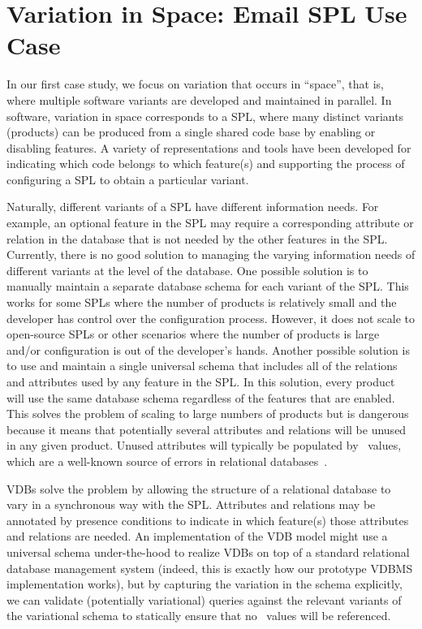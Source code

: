 \section{Variation in Space: Email SPL Use Case}
\label{sec:enron-vdb}


In our first case study, we focus on variation that occurs in ``space'', that
is, where multiple software variants are developed and maintained in parallel.
In software, variation in space corresponds to a SPL, where many distinct
variants (products) can be produced from a single shared code base by enabling
or disabling features. A variety of representations and tools have been
developed for indicating which code belongs to which feature(s) and supporting
the process of configuring a SPL to obtain a particular variant.



Naturally, different variants of a SPL have different information needs. For
example, an optional feature in the SPL may require a corresponding attribute
or relation in the database that is not needed by the other features in the
SPL.
%
Currently, there is no good solution to managing the varying information needs
of different variants at the level of the database.
%
One possible solution is to manually maintain a separate database schema for
each variant of the SPL. This works for some SPLs where the number of products
is relatively small and the developer has control over the configuration
process. However, it does not scale to open-source SPLs or other scenarios
where the number of products is large and/or configuration is out of the
developer's hands.
%
Another possible solution is to use and maintain a single universal schema that
includes all of the relations and attributes used by any feature in the SPL. In
this solution, every product will use the same database schema regardless of
the features that are enabled. This solves the problem of scaling to large
numbers of products but is dangerous because it means that potentially several
attributes and relations will be unused in any given product. Unused attributes
will typically be populated by \nul\ values, which are a well-known source of
errors in relational databases~\cite{AliceBook}.


VDBs solve the problem by allowing the structure of a relational database to
vary in a synchronous way with the SPL. Attributes and relations may be
annotated by presence conditions to indicate in which feature(s) those
attributes and relations are needed.
%
An implementation of the VDB model might use a universal schema under-the-hood
to realize VDBs on top of a standard relational database management system
(indeed, this is exactly how our prototype VDBMS implementation works), but by
capturing the variation in the schema explicitly, we can validate (potentially
variational) queries against the relevant variants of the variational schema to
statically ensure that no \nul\ values will be referenced.

